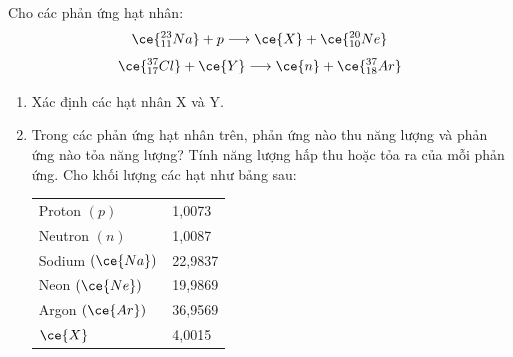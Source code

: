 \begin{ex}
	Cho các phản ứng hạt nhân:
	\begin{equation}
		\ce{^{23}_{11}Na}+p\longrightarrow\ce{X}+\ce{^{20}_{10}Ne}
		\label{eq: 1}
	\end{equation}
	\begin{equation}
		\ce{^{37}_{17}Cl}+\ce{Y}\longrightarrow\ce{n}+\ce{^{37}_{18}Ar}
		\label{eq: 2}
	\end{equation}
	\begin{enumerate}[label=\alph*)]
		\item Xác định các hạt nhân X và Y.
		\item Trong các phản ứng hạt nhân trên, phản ứng nào thu năng lượng và phản ứng nào tỏa năng lượng? Tính năng lượng hấp thu hoặc tỏa ra của mỗi phản ứng. Cho khối lượng các hạt như bảng sau:
		\begin{center}
			\begin{tabular}{|M{4cm}|M{4cm}|}
				\hline
				 & \\
				\hline
				Proton $\left(p\right)$ & 1,0073\\
				\hline
				Neutron $\left(n\right)$ & 1,0087\\
				\hline
				Sodium $\left(\ce{Na}\right)$ & 22,9837\\
				\hline
				Neon $\left(\ce{Ne}\right)$ & 19,9869\\
				\hline
				Argon $\left(\ce{Ar}\right)$ & 36,9569\\
				\hline
				$\ce{X}$ & 4,0015\\
				\hline
			\end{tabular}
		\end{center}
	\end{enumerate}
\end{ex}
